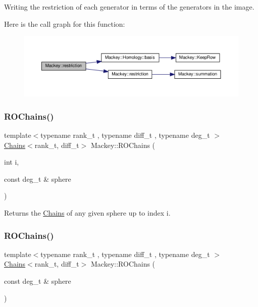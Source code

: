 Writing the restriction of each generator in terms of the generators in the image. 

Here is the call graph for this function\+:\nopagebreak
\begin{figure}[H]
\begin{center}
\leavevmode
\includegraphics[width=350pt]{namespaceMackey_a7b62b0d041087605dabd4ab3753f1186_cgraph}
\end{center}
\end{figure}
\mbox{\label{namespaceMackey_a08fd3743ffb625fceca454da757dfa5d}} 
\subsubsection{\texorpdfstring{R\+O\+Chains()}{ROChains()}\hspace{0.1cm}{\footnotesize\ttfamily [1/2]}}
{\footnotesize\ttfamily template$<$typename rank\+\_\+t , typename diff\+\_\+t , typename deg\+\_\+t $>$ \\
\hyperlink{classMackey_1_1Chains}{Chains}$<$rank\+\_\+t, diff\+\_\+t$>$ Mackey\+::\+R\+O\+Chains (\begin{DoxyParamCaption}\item[{int}]{i,  }\item[{const deg\+\_\+t \&}]{sphere }\end{DoxyParamCaption})}



Returns the \hyperlink{classMackey_1_1Chains}{Chains} of any given sphere up to index i. 

\mbox{\label{namespaceMackey_abd3c2e12c91baa573c6dbaa37eeb0518}} 
\subsubsection{\texorpdfstring{R\+O\+Chains()}{ROChains()}\hspace{0.1cm}{\footnotesize\ttfamily [2/2]}}
{\footnotesize\ttfamily template$<$typename rank\+\_\+t , typename diff\+\_\+t , typename deg\+\_\+t $>$ \\
\hyperlink{classMackey_1_1Chains}{Chains}$<$rank\+\_\+t, diff\+\_\+t$>$ Mackey\+::\+R\+O\+Chains (\begin{DoxyParamCaption}\item[{const deg\+\_\+t \&}]{sphere }\end{DoxyParamCaption})}



